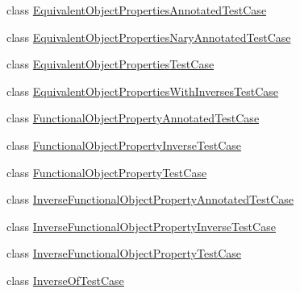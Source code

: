 \begin{DoxyCompactItemize}
\item 
class \hyperlink{classorg_1_1semanticweb_1_1owlapi_1_1api_1_1test_1_1objectproperties_1_1_equivalent_object_properties_annotated_test_case}{Equivalent\-Object\-Properties\-Annotated\-Test\-Case}
\item 
class \hyperlink{classorg_1_1semanticweb_1_1owlapi_1_1api_1_1test_1_1objectproperties_1_1_equivalent_object_properties_nary_annotated_test_case}{Equivalent\-Object\-Properties\-Nary\-Annotated\-Test\-Case}
\item 
class \hyperlink{classorg_1_1semanticweb_1_1owlapi_1_1api_1_1test_1_1objectproperties_1_1_equivalent_object_properties_test_case}{Equivalent\-Object\-Properties\-Test\-Case}
\item 
class \hyperlink{classorg_1_1semanticweb_1_1owlapi_1_1api_1_1test_1_1objectproperties_1_1_equivalent_object_properties_with_inverses_test_case}{Equivalent\-Object\-Properties\-With\-Inverses\-Test\-Case}
\item 
class \hyperlink{classorg_1_1semanticweb_1_1owlapi_1_1api_1_1test_1_1objectproperties_1_1_functional_object_property_annotated_test_case}{Functional\-Object\-Property\-Annotated\-Test\-Case}
\item 
class \hyperlink{classorg_1_1semanticweb_1_1owlapi_1_1api_1_1test_1_1objectproperties_1_1_functional_object_property_inverse_test_case}{Functional\-Object\-Property\-Inverse\-Test\-Case}
\item 
class \hyperlink{classorg_1_1semanticweb_1_1owlapi_1_1api_1_1test_1_1objectproperties_1_1_functional_object_property_test_case}{Functional\-Object\-Property\-Test\-Case}
\item 
class \hyperlink{classorg_1_1semanticweb_1_1owlapi_1_1api_1_1test_1_1objectproperties_1_1_inverse_functional_object_property_annotated_test_case}{Inverse\-Functional\-Object\-Property\-Annotated\-Test\-Case}
\item 
class \hyperlink{classorg_1_1semanticweb_1_1owlapi_1_1api_1_1test_1_1objectproperties_1_1_inverse_functional_object_property_inverse_test_case}{Inverse\-Functional\-Object\-Property\-Inverse\-Test\-Case}
\item 
class \hyperlink{classorg_1_1semanticweb_1_1owlapi_1_1api_1_1test_1_1objectproperties_1_1_inverse_functional_object_property_test_case}{Inverse\-Functional\-Object\-Property\-Test\-Case}
\item 
class \hyperlink{classorg_1_1semanticweb_1_1owlapi_1_1api_1_1test_1_1objectproperties_1_1_inverse_of_test_case}{Inverse\-Of\-Test\-Case}
\item 

\end{DoxyCompactItemize}
